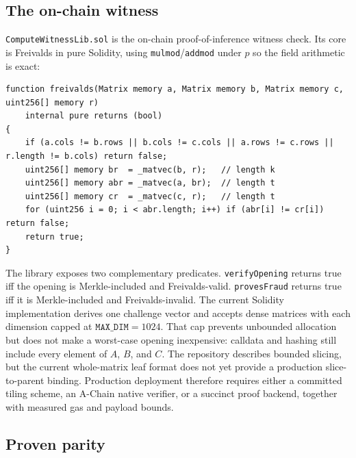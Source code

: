 \documentclass[11pt,a4paper]{article}
\begin{document}
\subsection{The on-chain witness}\label{sec:witness}

\texttt{ComputeWitnessLib.sol} is the on-chain proof-of-inference witness check. Its core is Freivalds in pure Solidity, using \texttt{mulmod}/\texttt{addmod} under $p$ so the field arithmetic is exact:

\begin{lstlisting}[language=Solidity,caption={Freivalds over $\mathbb{F}_p$ on-chain (\texttt{ComputeWitnessLib.sol}).}]
function freivalds(Matrix memory a, Matrix memory b, Matrix memory c, uint256[] memory r)
    internal pure returns (bool)
{
    if (a.cols != b.rows || b.cols != c.cols || a.rows != c.rows || r.length != b.cols) return false;
    uint256[] memory br  = _matvec(b, r);   // length k
    uint256[] memory abr = _matvec(a, br);  // length t
    uint256[] memory cr  = _matvec(c, r);   // length t
    for (uint256 i = 0; i < abr.length; i++) if (abr[i] != cr[i]) return false;
    return true;
}
\end{lstlisting}

The library exposes two complementary predicates. \texttt{verifyOpening} returns true iff the opening is Merkle-included and Freivalds-valid. \texttt{provesFraud} returns true iff it is Merkle-included and Freivalds-invalid. The current Solidity implementation derives one challenge vector and accepts dense matrices with each dimension capped at $\texttt{MAX\_DIM}=1024$. That cap prevents unbounded allocation but does not make a worst-case opening inexpensive: calldata and hashing still include every element of $A$, $B$, and $C$. The repository describes bounded slicing, but the current whole-matrix leaf format does not yet provide a production slice-to-parent binding. Production deployment therefore requires either a committed tiling scheme, an A-Chain native verifier, or a succinct proof backend, together with measured gas and payload bounds.

\subsection{Proven parity}
\end{document}

